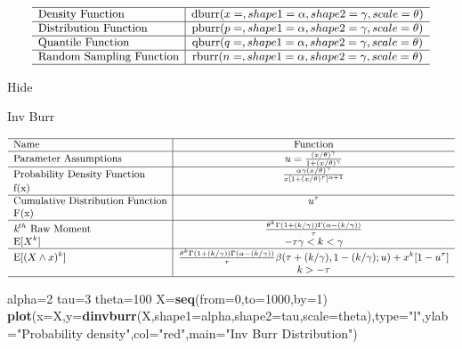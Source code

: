 \documentclass[]{book}
\newenvironment{Shaded}{\begin{snugshade}}{\end{snugshade}}
\newcommand{\KeywordTok}[1]{\textcolor[rgb]{0.13,0.29,0.53}{\textbf{#1}}}
\newcommand{\DataTypeTok}[1]{\textcolor[rgb]{0.13,0.29,0.53}{#1}}
\newcommand{\DecValTok}[1]{\textcolor[rgb]{0.00,0.00,0.81}{#1}}
\newcommand{\StringTok}[1]{\textcolor[rgb]{0.31,0.60,0.02}{#1}}
\newcommand{\NormalTok}[1]{#1}
\begin{document}
\[
{\small
\begin{matrix}
\begin{array}{l|c}
\hline
  \text{Density Function} & \text{dburr}(x=, shape1=\alpha, shape2=\gamma, scale=\theta) \\
\hline
  \text{Distribution Function} & \text{pburr}(p=, shape1=\alpha, shape2=\gamma, scale=\theta) \\
\hline
  \text{Quantile Function} & \text{qburr}(q=, shape1=\alpha, shape2=\gamma, scale=\theta) \\ 
\hline
  \text{Random Sampling Function} & \text{rburr}(n=, shape1=\alpha, shape2=\gamma, scale=\theta) \\
\hline
\end{array}
\end{matrix}
}
\]

\hypertarget{3pC}{}
{Hide}

Inv Burr

\[
{\small
\begin{matrix}
\begin{array}{l|c}
\hline
  \text{Name} & \text{Function} \\
\hline
  \text{Parameter Assumptions} & u=\frac{(x/\theta)^\gamma}{1+(x/\theta)^\gamma} \\
\hline
  \text{Probability Density Function} & \frac{\alpha\gamma(x/\theta)^\gamma}{x[1+(x/\theta)^\tau]^{\alpha+1}} \\
    \text{f(x)} & \\
\hline
  \text{Cumulative Distribution Function} & u^\tau \\
    \text{F(x)} & \\
\hline
  \textit{k}^{th}~\text{Raw Moment} & \frac{\theta^k\Gamma(1+(k/\gamma))\Gamma(\alpha-(k/\gamma))}{\tau} \\
  \mathrm{E}[X^k]  & -\tau\gamma<k<\gamma \\
\hline
  \mathrm{E}[(X\wedge x)^k] & \frac{\theta^k\Gamma(1+(k/\gamma))\Gamma(\alpha-(k/\gamma))}{\tau}\beta(\tau+(k/\gamma),1-(k/\gamma);u)+x^k[1-u^\tau]  \\
  & k>-\tau \\
\hline
\end{array}
\end{matrix}
}
\]

\begin{Shaded}
\begin{Highlighting}[]
\NormalTok{alpha=}\DecValTok{2}
\NormalTok{tau=}\DecValTok{3}
\NormalTok{theta=}\DecValTok{100}
\NormalTok{X=}\KeywordTok{seq}\NormalTok{(}\DataTypeTok{from=}\DecValTok{0}\NormalTok{,}\DataTypeTok{to=}\DecValTok{1000}\NormalTok{,}\DataTypeTok{by=}\DecValTok{1}\NormalTok{)}
\KeywordTok{plot}\NormalTok{(}\DataTypeTok{x=}\NormalTok{X,}\DataTypeTok{y=}\KeywordTok{dinvburr}\NormalTok{(X,}\DataTypeTok{shape1=}\NormalTok{alpha,}\DataTypeTok{shape2=}\NormalTok{tau,}\DataTypeTok{scale=}\NormalTok{theta),}\DataTypeTok{type=}\StringTok{"l"}\NormalTok{,}\DataTypeTok{ylab=}\StringTok{"Probability density"}\NormalTok{,}\DataTypeTok{col=}\StringTok{"red"}\NormalTok{,}\DataTypeTok{main=}\StringTok{"Inv Burr Distribution"}\NormalTok{)}
\end{Highlighting}
\end{Shaded}
\end{document}
